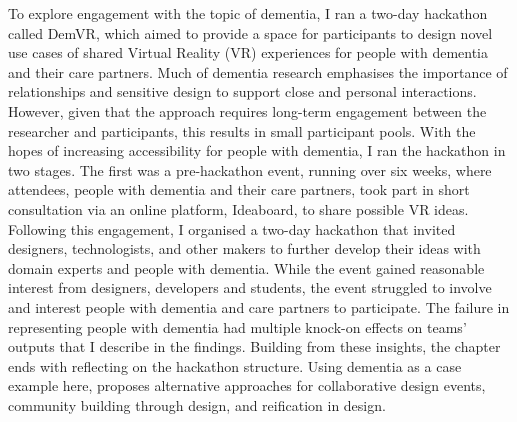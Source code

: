 To explore engagement with the topic of dementia, I ran a two-day hackathon called DemVR, which aimed to provide a space for participants to design novel use cases of shared Virtual Reality (VR) experiences for people with dementia and their care partners. Much of dementia research emphasises the importance of relationships and sensitive design to support close and personal interactions. However, given that the approach requires long-term engagement between the researcher and participants, this results in small participant pools. With the hopes of increasing accessibility for people with dementia, I ran the hackathon in two stages. The first was a pre-hackathon event, running over six weeks, where attendees, people with dementia and their care partners, took part in short consultation via an online platform, Ideaboard, to share possible VR ideas. Following this engagement, I organised a two-day hackathon that invited designers, technologists, and other makers to further develop their ideas with domain experts and people with dementia. While the event gained reasonable interest from designers, developers and students, the event struggled to involve and interest people with dementia and care partners to participate. The failure in representing people with dementia had multiple knock-on effects on teams' outputs that I describe in the findings. Building from these insights, the chapter ends with reflecting on the hackathon structure. Using dementia as a case example here, proposes alternative approaches for collaborative design events, community building through design, and reification in design.



